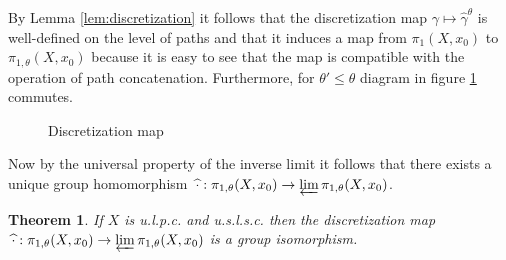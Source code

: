 \documentclass[a4paper, 11pt, twoside]{article}
\theoremstyle{break}
\newtheorem{thm}{Theorem}[section]
\theoremstyle{break}
\begin{document}
By Lemma \ref{lem:discretization} it follows that the discretization map $\gamma \mapsto \widehat{\gamma}^{\theta}$ is well-defined on the level of paths
and that it induces a map from $\pi_1(X, x_0)$ to $\pi_{1,\theta}(X, x_0)$ because it is easy to see that the map is compatible with the operation of path concatenation.
Furthermore, for $\theta' \leq \theta$ diagram in figure \ref{fig:discretization} commutes.

\begin{figure}[ht!]
  \centering
  \caption{Discretization map}\label{fig:discretization}
\end{figure}

Now by the universal property of the inverse limit it follows that there exists a unique group homomorphism $\: \widehat{\cdot} : \pi_{1,\theta}(X, x_0) \to \varprojlim \pi_{1,\theta}(X, x_0)$.

\begin{thm} \label{thm:isomorphism}
  If $X$ is u.l.p.c. and u.s.l.s.c. then the discretization map $\: \widehat{\cdot} : \pi_{1,\theta}(X, x_0) \to \varprojlim \pi_{1,\theta}(X, x_0)$ is a group isomorphism.
\end{thm}
\end{document}

